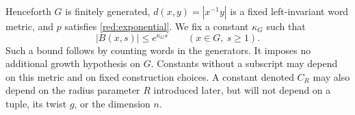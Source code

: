 Henceforth $G$ is finitely generated, $d(x,y)=|x^{-1}y|$ is a fixed
left-invariant word metric, and $p$ satisfies \eqref{red:exponential}.
We fix a constant $\kappa_G$ such that
\begin{equation}\label{red:balls}
 |B(x,s)|\le e^{\kappa_G s}\qquad(x\in G,\ s\ge1).
\end{equation}
Such a bound follows by counting words in the generators. It imposes
no additional growth hypothesis on $G$.
Constants without a subscript may depend on this metric and on fixed
construction choices. A constant denoted $C_R$ may also depend on the
radius parameter $R$ introduced later, but will not depend on a tuple,
its twist $g$, or the dimension $n$.
